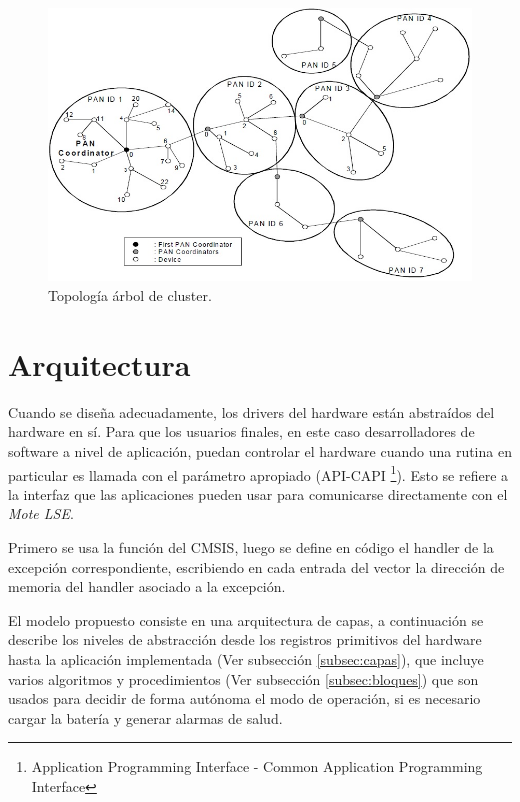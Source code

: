 {\begin{figure}[h!]
	\centering
    \includegraphics[width=.8\textwidth]{./Figures/cluster.jpg}
    	\caption{Topología árbol de cluster.}
	\label{fig:clust}
\end{figure}

\section{Arquitectura}
\label{sec:arq}
Cuando se diseña adecuadamente, los drivers del hardware están abstraídos del hardware en sí. Para que los usuarios finales, en este caso desarrolladores de software a nivel de aplicación, puedan controlar el hardware cuando una rutina en particular es llamada con el parámetro apropiado (API-CAPI \footnote{Application Programming Interface - Common Application Programming Interface}). Esto se refiere a la interfaz que las aplicaciones pueden usar para comunicarse directamente con el \textit{Mote LSE}.

Primero se usa la función del CMSIS, luego se define en código el handler de la excepción correspondiente, escribiendo en cada entrada del vector la dirección de memoria del handler asociado a la excepción.

El modelo propuesto consiste en una arquitectura de capas, a continuación se describe los niveles de abstracción desde los registros primitivos del hardware hasta la aplicación implementada (Ver subsección \ref{subsec:capas}), que incluye varios algoritmos y procedimientos (Ver subsección \ref{subsec:bloques}) que son usados para decidir de forma autónoma el modo de operación, si es necesario cargar la batería y generar alarmas de salud.

}
